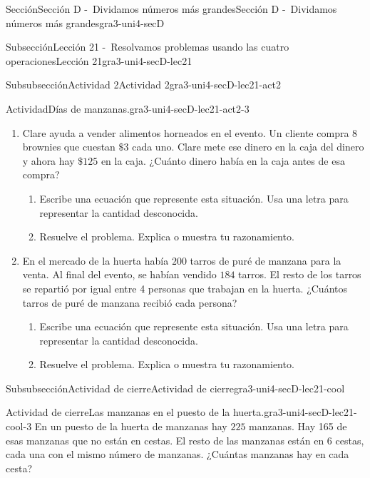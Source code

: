 \documentclass[twoside,14pt,]{extarticle}
\begin{document}
\begin{sectionptx}{Sección}{Sección D -~Dividamos números más grandes}{}{Sección D -~Dividamos números más grandes}{}{}{gra3-uni4-secD}
\begin{subsectionptx}{Subsección}{Lección 21 -~Resolvamos problemas usando las cuatro operaciones}{}{Lección 21}{}{}{gra3-uni4-secD-lec21}
\begin{subsubsectionptx}{Subsubsección}{Actividad 2}{}{Actividad 2}{}{}{gra3-uni4-secD-lec21-act2}
\begin{activity}{Actividad}{Días de manzanas.}{gra3-uni4-secD-lec21-act2-3}
\begin{enumerate}
%
\begin{enumerate}
\item{}Escribe una ecuación que represente esta situación. Usa una letra para representar la cantidad desconocida.%
\item{}Resuelve el problema. Explica o muestra tu razonamiento.%
\end{enumerate}
\item{}Clare ayuda a vender alimentos horneados en el evento. Un cliente compra \(8\) brownies que cuestan \(\$3\) cada uno. Clare mete ese dinero en la caja del dinero y ahora hay \(\$125\) en la caja. ¿Cuánto dinero había en la caja antes de esa compra?%
%
\begin{enumerate}
\item{}Escribe una ecuación que represente esta situación. Usa una letra para representar la cantidad desconocida.%
\item{}Resuelve el problema. Explica o muestra tu razonamiento.%
\end{enumerate}
\item{}En el mercado de la huerta había \(200\) tarros de puré de manzana para la venta. Al final del evento, se habían vendido \(184\) tarros. El resto de los tarros se repartió por igual entre 4 personas que trabajan en la huerta. ¿Cuántos tarros de puré de manzana recibió cada persona?%
%
\begin{enumerate}
\item{}Escribe una ecuación que represente esta situación. Usa una letra para representar la cantidad desconocida.%
\item{}Resuelve el problema. Explica o muestra tu razonamiento.%
\end{enumerate}
\end{enumerate}
\end{activity}%
\end{subsubsectionptx}
%
%
\typeout{************************************************}
\typeout{************************************************}
%
\begin{subsubsectionptx}{Subsubsección}{Actividad de cierre}{}{Actividad de cierre}{}{}{gra3-uni4-secD-lec21-cool}
\begin{project}{Actividad de cierre}{Las manzanas en el puesto de la huerta.}{gra3-uni4-secD-lec21-cool-3}%
En un puesto de la huerta de manzanas hay \(225\) manzanas. Hay 165 de esas manzanas que no están en cestas. El resto de las manzanas están en \(6\) cestas, cada una con el mismo número de manzanas. ¿Cuántas manzanas hay en cada cesta?%

\end{project}
\end{subsubsectionptx}
\end{subsectionptx}
\end{sectionptx}
\end{document}
